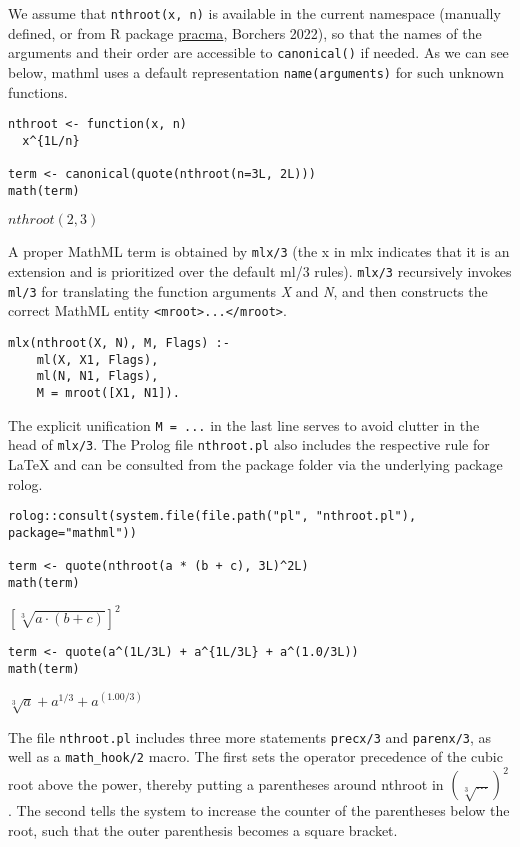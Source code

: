 We assume that \texttt{nthroot(x,~n)} is available in the current namespace
(manually defined, or from R package
\href{https://CRAN.R-project.org/package=pracma}{pracma}, Borchers 2022), so
that the names of the arguments and their order are accessible to
\texttt{canonical()} if needed. As we can see below, mathml uses a default
representation \texttt{name(arguments)} for such unknown functions.

\begin{verbatim}
nthroot <- function(x, n)
  x^{1L/n}

term <- canonical(quote(nthroot(n=3L, 2L)))
math(term)
\end{verbatim}

\(nthroot{\left({2}{{,}{3}}\right)}\)

A proper MathML term is obtained by \texttt{mlx/3} (the x in mlx indicates that
it is an extension and is prioritized over the default ml/3 rules).
\texttt{mlx/3} recursively invokes \texttt{ml/3} for translating the function
arguments \emph{X} and \emph{N}, and then constructs the correct MathML entity
\texttt{\textless{}mroot\textgreater{}...\textless{}/mroot\textgreater{}}.

\begin{verbatim}
mlx(nthroot(X, N), M, Flags) :-
    ml(X, X1, Flags),
    ml(N, N1, Flags),
    M = mroot([X1, N1]).
\end{verbatim}

The explicit unification \texttt{M~=~...} in the last line serves to avoid
clutter in the head of \texttt{mlx/3}. The Prolog file \texttt{nthroot.pl} also
includes the respective rule for LaTeX and can be consulted from the
package folder via the underlying package rolog.

\begin{verbatim}
rolog::consult(system.file(file.path("pl", "nthroot.pl"), package="mathml"))

term <- quote(nthroot(a * (b + c), 3L)^2L)
math(term)
\end{verbatim}

\({\left[\sqrt[3]{{a}{\cdot}{\left({b}{+}{c}\right)}}\right]}^{2}\)

\begin{verbatim}
term <- quote(a^(1L/3L) + a^{1L/3L} + a^(1.0/3L))
math(term)
\end{verbatim}

\({{\sqrt[3]{a}}{+}{{a}^{{1}{/}{3}}}}{+}{{a}^{\left({1.00}{/}{3}\right)}}\)

The file \texttt{nthroot.pl} includes three more statements \texttt{precx/3} and
\texttt{parenx/3}, as well as a \texttt{math\_hook/2} macro. The first sets the
operator precedence of the cubic root above the power, thereby putting a
parentheses around nthroot in \((\sqrt[3]{\ldots})^2\). The second tells
the system to increase the counter of the parentheses below the root,
such that the outer parenthesis becomes a square bracket.

